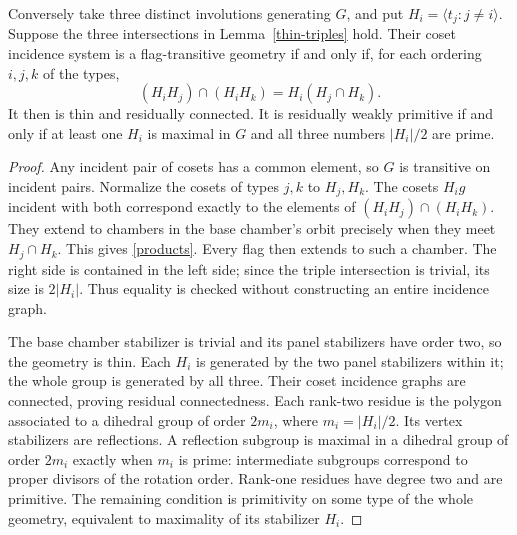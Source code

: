 \begin{lemma}\label{thin-recognize}
Conversely take three distinct involutions generating $G$, and put
$H_i=\langle t_j:j\ne i\rangle$. Suppose the three intersections in
Lemma~\ref{thin-triples} hold. Their coset incidence system is a flag-transitive
geometry if and only if, for each ordering $i,j,k$ of the types,
\begin{equation}\label{products}
        (H_iH_j)\cap(H_iH_k)=H_i(H_j\cap H_k).
\end{equation}
It then is thin and residually connected. It is residually weakly primitive
if and only if at least one $H_i$ is maximal in $G$ and all three numbers
$|H_i|/2$ are prime.
\end{lemma}
\begin{proof}
Any incident pair of cosets has a common element, so $G$ is transitive
on incident pairs. Normalize the cosets of types $j,k$ to $H_j,H_k$.
The cosets $H_i g$ incident with both correspond exactly to the elements
of $(H_iH_j)\cap(H_iH_k)$. They extend to chambers in the base chamber's
orbit precisely when they meet $H_j\cap H_k$. This gives
\eqref{products}. Every flag then extends to such a chamber. The right
side is contained in the left side; since the triple intersection is
trivial, its size is $2|H_i|$. Thus equality is checked without constructing
an entire incidence graph.

The base chamber stabilizer is trivial and its panel stabilizers have
order two, so the geometry is thin. Each $H_i$ is generated by the two
panel stabilizers within it; the whole group is generated by all three.
Their coset incidence graphs are connected, proving residual connectedness.
Each rank-two residue is the polygon associated to a dihedral group of
order $2m_i$, where $m_i=|H_i|/2$. Its vertex stabilizers are reflections.
A reflection subgroup is maximal in a dihedral group of order $2m_i$
exactly when $m_i$ is prime: intermediate subgroups correspond to proper
divisors of the rotation order. Rank-one residues have degree two and
are primitive. The remaining condition is primitivity on some type of
the whole geometry, equivalent to maximality of its stabilizer $H_i$.
\end{proof}

